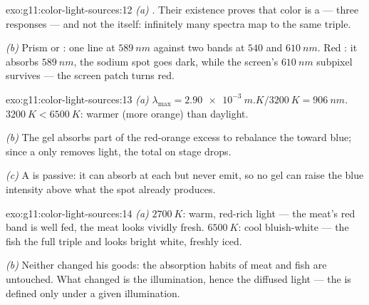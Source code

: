 \begin{solution}{exo:g11:color-light-sources:12}
\emph{(a)} . Their existence proves that color is a 
--- three  responses --- and not the  itself: infinitely
many spectra map to the same triple.

\emph{(b)} Prism or : one line at $\qty{589}{nm}$ against
two bands at $540$ and $\qty{610}{nm}$. Red : it absorbs
$\qty{589}{nm}$, the sodium spot goes dark, while the screen's
$\qty{610}{nm}$ subpixel survives --- the screen patch turns red.
\end{solution}

\begin{solution}{exo:g11:color-light-sources:13}
\emph{(a)} $\lambda_{\max} = \qty{2.90e-3}{m.K}/\qty{3200}{K} =
\qty{906}{nm}$.  $\qty{3200}{K} < \qty{6500}{K}$:
warmer (more orange) than daylight.

\emph{(b)} The gel absorbs part of the red-orange excess to rebalance
the  toward blue; since a  only removes light, the total
 on stage drops.

\emph{(c)} A  is passive: it can absorb at each  but
never emit, so no gel can raise the blue intensity above what the spot
already produces.
\end{solution}

\begin{solution}{exo:g11:color-light-sources:14}
\emph{(a)} $\qty{2700}{K}$: warm, red-rich light --- the meat's red band
is well fed, the meat looks vividly fresh. $\qty{6500}{K}$: cool
bluish-white --- the fish  the full triple and looks bright
white, freshly iced.

\emph{(b)} Neither changed his goods: the absorption habits of meat and
fish are untouched. What changed is the illumination, hence the diffused
light --- the  is defined only under a given
illumination.
\end{solution}

